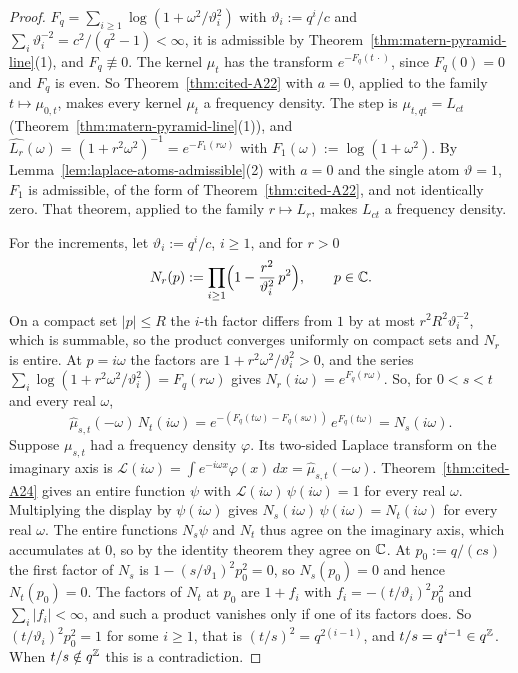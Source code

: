 \begin{proof}
$F_q = \sum_{i \ge 1}\log(1 + \omega^2/\vartheta_i^2)$ with $\vartheta_i := q^i/c$ and
$\sum_i\vartheta_i^{-2} = c^2/(q^2 - 1) < \infty$, it is admissible by
Theorem~\ref{thm:matern-pyramid-line}(1), and $F_q \not\equiv 0$. The kernel $\mu_t$ has the
transform $e^{-F_q(t\,\cdot)}$, since $F_q(0) = 0$ and $F_q$ is even. So
Theorem~\ref{thm:cited-A22} with $a = 0$, applied
to the family $t \mapsto \mu_{0,t}$, makes every kernel $\mu_t$ a \Polya{} frequency density. The
step is $\mu_{t,qt} = L_{ct}$ (Theorem~\ref{thm:matern-pyramid-line}(1)), and
$\widehat{L_r}(\omega) = (1 + r^2\omega^2)^{-1} = e^{-F_1(r\omega)}$ with
$F_1(\omega) := \log(1 + \omega^2)$. By Lemma~\ref{lem:laplace-atoms-admissible}(2) with $a = 0$
and the single atom $\vartheta = 1$, $F_1$ is admissible, of the form of
Theorem~\ref{thm:cited-A22}, and not identically zero. That theorem, applied to the family
$r \mapsto L_r$, makes $L_{ct}$ a \Polya{} frequency density.

For the increments, let $\vartheta_i := q^i/c$, $i \ge 1$, and for $r > 0$
\[
  N_r(p) := \prod_{i \ge 1}\Bigl(1 - \frac{r^2}{\vartheta_i^2}\,p^2\Bigr), \qquad p \in \mathbb{C} .
\]
On a compact set $|p| \le R$ the $i$-th factor differs from $1$ by at most $r^2R^2\vartheta_i^{-2}$,
which is summable, so the product converges uniformly on compact sets and $N_r$ is entire. At
$p = i\omega$ the factors are $1 + r^2\omega^2/\vartheta_i^2 > 0$, and the series
$\sum_i\log(1 + r^2\omega^2/\vartheta_i^2) = F_q(r\omega)$ gives $N_r(i\omega) = e^{F_q(r\omega)}$.
So, for $0 < s < t$ and every real $\omega$,
\[
  \widehat\mu_{s,t}(-\omega)\,N_t(i\omega) = e^{-(F_q(t\omega) - F_q(s\omega))}\,e^{F_q(t\omega)}
  = N_s(i\omega).
\]
Suppose $\mu_{s,t}$ had a \Polya{} frequency density $\varphi$. Its two-sided Laplace transform
on the imaginary axis is $\mathcal{L}(i\omega) = \int e^{-i\omega x}\varphi(x)\,dx =
\widehat\mu_{s,t}(-\omega)$. Theorem~\ref{thm:cited-A24} gives an entire function $\psi$ with
$\mathcal{L}(i\omega)\,\psi(i\omega) = 1$ for every real $\omega$. Multiplying the display by
$\psi(i\omega)$ gives $N_s(i\omega)\,\psi(i\omega) = N_t(i\omega)$ for every real $\omega$. The
entire functions $N_s\psi$ and $N_t$ thus agree on the imaginary axis, which accumulates at $0$,
so by the identity theorem they agree on $\mathbb{C}$. At $p_0 := q/(cs)$ the first factor of $N_s$ is
$1 - (s/\vartheta_1)^2p_0^2 = 0$, so $N_s(p_0) = 0$ and hence $N_t(p_0) = 0$. The factors of $N_t$
at $p_0$ are $1 + f_i$ with $f_i = -(t/\vartheta_i)^2p_0^2$ and $\sum_i|f_i| < \infty$, and such a
product vanishes only if one of its factors does. So $(t/\vartheta_i)^2p_0^2 = 1$ for some
$i \ge 1$, that is $(t/s)^2 = q^{2(i-1)}$, and $t/s = q^{i-1} \in q^{\mathbb{Z}}$. When
$t/s \notin q^{\mathbb{Z}}$ this is a contradiction.
\end{proof}

